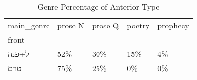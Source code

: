 \begin{table}[htbp!]
\centering
\caption{Genre Percentage of Anterior Type}
\label{table:antgenre_pc}
\begin{tabular}{lllll}
\toprule
main\_genre & prose-N & prose-Q & poetry & prophecy \\
front &         &         &        &          \\
\midrule
ל+פנה &     52\% &     30\% &    15\% &       4\% \\
טרם   &     75\% &     25\% &     0\% &       0\% \\
\bottomrule
\end{tabular}
\end{table}
